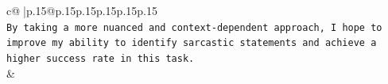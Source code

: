 \documentclass{article}
\begin{document}
{\begin{supertabular}{c@{$\;$}|p{.15\linewidth}@{}p{.15\linewidth}p{.15\linewidth}p{.15\linewidth}p{.15\linewidth}p{.15\linewidth}}
{{{\\ 
\texttt{By taking a more nuanced and context{-}dependent approach, I hope to improve my ability to identify sarcastic statements and achieve a higher success rate in this task.} \\
            }
        }
    }
    & \\ \\

\end{supertabular}
}
\end{document}
